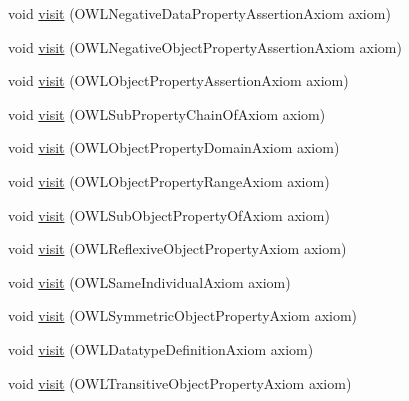 \begin{DoxyCompactItemize}
void \hyperlink{classorg_1_1coode_1_1owlapi_1_1latex_1_1_latex_object_visitor_a9bec47824274a0024d8cdb5dc1a863cd}{visit} (O\-W\-L\-Negative\-Data\-Property\-Assertion\-Axiom axiom)
\item 
void \hyperlink{classorg_1_1coode_1_1owlapi_1_1latex_1_1_latex_object_visitor_abfe2cffadf9aa45d4dc237226a0abdcf}{visit} (O\-W\-L\-Negative\-Object\-Property\-Assertion\-Axiom axiom)
\item 
void \hyperlink{classorg_1_1coode_1_1owlapi_1_1latex_1_1_latex_object_visitor_aaa4a292dd2c04ff16c3f593fbf81fa6c}{visit} (O\-W\-L\-Object\-Property\-Assertion\-Axiom axiom)
\item 
void \hyperlink{classorg_1_1coode_1_1owlapi_1_1latex_1_1_latex_object_visitor_a6d7cda3bcf8c435e39b8572f0aabfd8a}{visit} (O\-W\-L\-Sub\-Property\-Chain\-Of\-Axiom axiom)
\item 
void \hyperlink{classorg_1_1coode_1_1owlapi_1_1latex_1_1_latex_object_visitor_a7927943d1f0849516d4b0ca614d9ed63}{visit} (O\-W\-L\-Object\-Property\-Domain\-Axiom axiom)
\item 
void \hyperlink{classorg_1_1coode_1_1owlapi_1_1latex_1_1_latex_object_visitor_a11f65d7f0f22d44f0903c50b67daa7ac}{visit} (O\-W\-L\-Object\-Property\-Range\-Axiom axiom)
\item 
void \hyperlink{classorg_1_1coode_1_1owlapi_1_1latex_1_1_latex_object_visitor_a36d84c786c91597e79c5dd8b10558bb8}{visit} (O\-W\-L\-Sub\-Object\-Property\-Of\-Axiom axiom)
\item 
void \hyperlink{classorg_1_1coode_1_1owlapi_1_1latex_1_1_latex_object_visitor_a3956e3a566201b4e7251af0be19a87a0}{visit} (O\-W\-L\-Reflexive\-Object\-Property\-Axiom axiom)
\item 
void \hyperlink{classorg_1_1coode_1_1owlapi_1_1latex_1_1_latex_object_visitor_af47a24f6d89d8f920fb4289193653995}{visit} (O\-W\-L\-Same\-Individual\-Axiom axiom)
\item 
void \hyperlink{classorg_1_1coode_1_1owlapi_1_1latex_1_1_latex_object_visitor_aaa71c8696f1639835ca5eee8e724c503}{visit} (O\-W\-L\-Symmetric\-Object\-Property\-Axiom axiom)
\item 
void \hyperlink{classorg_1_1coode_1_1owlapi_1_1latex_1_1_latex_object_visitor_ac9f8666a0be4b40efcd669e98390eb44}{visit} (O\-W\-L\-Datatype\-Definition\-Axiom axiom)
\item 
void \hyperlink{classorg_1_1coode_1_1owlapi_1_1latex_1_1_latex_object_visitor_a7dceb318b7f6ec00ebc71382f3ce7b18}{visit} (O\-W\-L\-Transitive\-Object\-Property\-Axiom axiom)
\item 

\end{DoxyCompactItemize}
